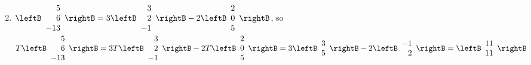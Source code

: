\begin{multicols}{2}
\begin{ex}
{\begin{enumerate}[label={\alph*.}]
\end{enumerate}}
\begin{sol}
\begin{enumerate}[label={\alph*.}]
\setcounter{enumi}{1}
\item $\leftB \begin{array}{r}
5 \\
6 \\
-13
\end{array} \rightB = 3 \leftB \begin{array}{r}
3 \\
2 \\
-1
\end{array} \rightB - 2 \leftB \begin{array}{r}
2 \\
0 \\
5
\end{array} \rightB$, so\\
$T \leftB \begin{array}{r}
5 \\
6 \\
-13
\end{array} \rightB = 3T \leftB \begin{array}{r}
3 \\
2 \\
-1
\end{array} \rightB - 2T \leftB \begin{array}{r}
2 \\
0 \\
5
\end{array} \rightB = 3 \leftB \begin{array}{r}
3 \\
5
\end{array} \rightB - 2 \leftB \begin{array}{r}
-1 \\
2
\end{array} \rightB = \leftB \begin{array}{r}
11 \\
11
\end{array} \rightB$

\end{enumerate}
\end{sol}
\end{ex}



\end{multicols}
